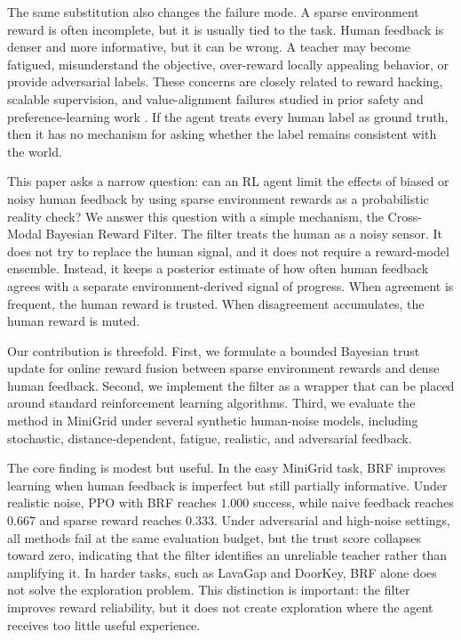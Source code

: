 \documentclass[11pt]{article}
\begin{document}
The same substitution also changes the failure mode. A sparse environment reward is often incomplete, but it is usually tied to the task. Human feedback is denser and more informative, but it can be wrong. A teacher may become fatigued, misunderstand the objective, over-reward locally appealing behavior, or provide adversarial labels. These concerns are closely related to reward hacking, scalable supervision, and value-alignment failures studied in prior safety and preference-learning work \cite{amodei2016concrete,hadfield2016cooperative,gao2023scaling}. If the agent treats every human label as ground truth, then it has no mechanism for asking whether the label remains consistent with the world.

This paper asks a narrow question: can an RL agent limit the effects of biased or noisy human feedback by using sparse environment rewards as a probabilistic reality check?
We answer this question with a simple mechanism, the Cross-Modal Bayesian Reward Filter. The filter treats the human as a noisy sensor. It does not try to replace the human signal, and it does not require a reward-model ensemble. Instead, it keeps a posterior estimate of how often human feedback agrees with a separate environment-derived signal of progress. When agreement is frequent, the human reward is trusted. When disagreement accumulates, the human reward is muted.

Our contribution is threefold. First, we formulate a bounded Bayesian trust update for online reward fusion between sparse environment rewards and dense human feedback. Second, we implement the filter as a wrapper that can be placed around standard reinforcement learning algorithms. Third, we evaluate the method in MiniGrid under several synthetic human-noise models, including stochastic, distance-dependent, fatigue, realistic, and adversarial feedback.

The core finding is modest but useful. In the easy MiniGrid task, BRF improves learning when human feedback is imperfect but still partially informative. Under realistic noise, PPO with BRF reaches $1.000$ success, while naive feedback reaches $0.667$ and sparse reward reaches $0.333$. Under adversarial and high-noise settings, all methods fail at the same evaluation budget, but the trust score collapses toward zero, indicating that the filter identifies an unreliable teacher rather than amplifying it. In harder tasks, such as LavaGap and DoorKey, BRF alone does not solve the exploration problem. This distinction is important: the filter improves reward reliability, but it does not create exploration where the agent receives too little useful experience.
\end{document}
